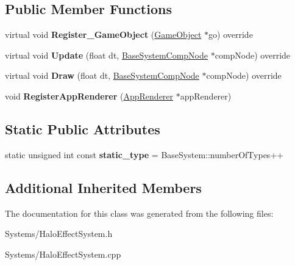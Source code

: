 \subsection*{Public Member Functions}
\begin{DoxyCompactItemize}
\item 
\mbox{\label{classHaloEffectSystem_ac2fd94f59ade2846175bd791eafab73c}} 
virtual void {\bfseries Register\+\_\+\+Game\+Object} (\hyperlink{classGameObject}{Game\+Object} $\ast$go) override
\item 
\mbox{\label{classHaloEffectSystem_ad98bff0ea12ef7d8abb1c917318e6028}} 
virtual void {\bfseries Update} (float dt, \hyperlink{structBaseSystemCompNode}{Base\+System\+Comp\+Node} $\ast$comp\+Node) override
\item 
\mbox{\label{classHaloEffectSystem_a22ad4ee7f66c27eaabdb728e72c2cf1f}} 
virtual void {\bfseries Draw} (float dt, \hyperlink{structBaseSystemCompNode}{Base\+System\+Comp\+Node} $\ast$comp\+Node) override
\item 
\mbox{\label{classHaloEffectSystem_a3ab6dc147cb6533a0ae0921ceb165aa4}} 
void {\bfseries Register\+App\+Renderer} (\hyperlink{classAppRenderer}{App\+Renderer} $\ast$app\+Renderer)
\end{DoxyCompactItemize}
\subsection*{Static Public Attributes}
\begin{DoxyCompactItemize}
\item 
\mbox{\label{classHaloEffectSystem_a04aecc4da2b11a3f3a0268e8443e34dd}} 
static unsigned int const {\bfseries static\+\_\+type} = Base\+System\+::number\+Of\+Types++
\end{DoxyCompactItemize}
\subsection*{Additional Inherited Members}


The documentation for this class was generated from the following files\+:\begin{DoxyCompactItemize}
\item 
Systems/Halo\+Effect\+System.\+h\item 
Systems/Halo\+Effect\+System.\+cpp\end{DoxyCompactItemize}
